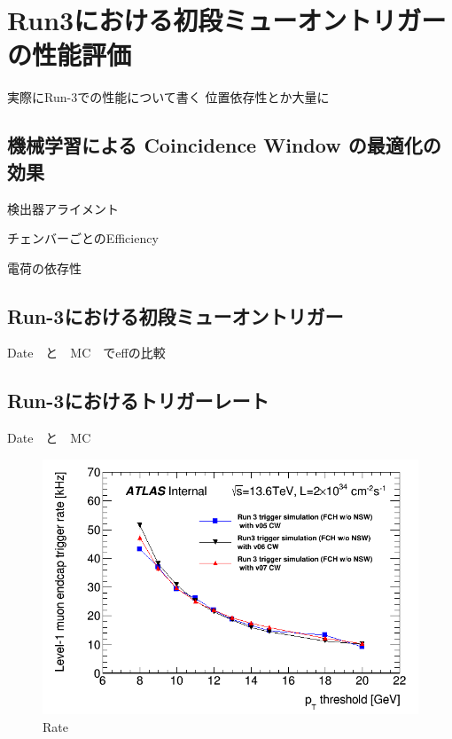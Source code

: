 \chapter{Run3における初段ミューオントリガーの性能評価}
実際にRun-3での性能について書く
位置依存性とか大量に

\section{機械学習による Coincidence Window の最適化の効果}
検出器アライメント

チェンバーごとのEfficiency

電荷の依存性



\section{Run-3における初段ミューオントリガー}
Date　と　MC　でeffの比較

\section{Run-3におけるトリガーレート}
Date　と　MC
\begin{figure}[tb]
  \centering
  \includegraphics[clip, width=14cm]{fig/5/l1mue_rate_run3.png}
  \caption{Rate}
  \label{fig:fit_def}
\end{figure}


